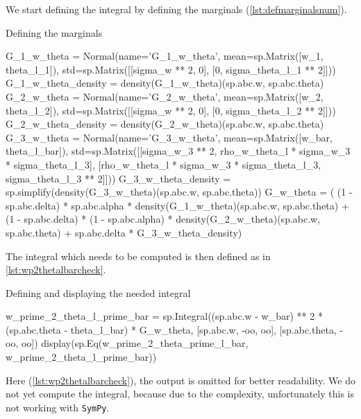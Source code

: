 We start defining the integral by defining the marginals (\cref{lst:defmarginalsnum}).
\begin{listing}[!ht]
    \caption{Defining the marginals}
    \label{lst:defmarginalsnum}
    \begin{pythoncode}
        G_1_w_theta = Normal(name='G_1_w_theta', mean=sp.Matrix([w_1, theta_l_1]),
            std=sp.Matrix([[sigma_w ** 2, 0], [0, sigma_theta_l_1 ** 2]]))
        G_1_w_theta_density = density(G_1_w_theta)(sp.abc.w, sp.abc.theta)
        G_2_w_theta = Normal(name='G_2_w_theta', mean=sp.Matrix([w_2, theta_l_2]),
            std=sp.Matrix([[sigma_w ** 2, 0], [0, sigma_theta_l_2 ** 2]]))
        G_2_w_theta_density = density(G_2_w_theta)(sp.abc.w, sp.abc.theta)
        G_3_w_theta = Normal(name='G_3_w_theta', mean=sp.Matrix([w_bar, theta_l_bar]),
            std=sp.Matrix([[sigma_w_3 ** 2,
                rho_w_theta_l * sigma_w_3 * sigma_theta_l_3],
                [rho_w_theta_l * sigma_w_3 * sigma_theta_l_3,
                sigma_theta_l_3 ** 2]]))
        G_3_w_theta_density = sp.simplify(density(G_3_w_theta)(sp.abc.w, sp.abc.theta))
        G_w_theta = (
        (1 - sp.abc.delta) * sp.abc.alpha * density(G_1_w_theta)(sp.abc.w, sp.abc.theta) 
        + (1 - sp.abc.delta) * (1 - sp.abc.alpha) * density(G_2_w_theta)(sp.abc.w, sp.abc.theta) 
        + sp.abc.delta * G_3_w_theta_density)
    \end{pythoncode}
\end{listing}

The integral which needs to be computed is then defined as in \cref{lst:wp2thetalbarcheck}.
\begin{listing}[!ht]
    \caption{Defining and displaying the needed integral}
    \label{lst:wp2thetalbarcheck}
    \begin{pythoncode}
        w_prime_2_theta_l_prime_bar = sp.Integral((sp.abc.w - w_bar) ** 2 * 
            (sp.abc.theta - theta_l_bar) * G_w_theta, 
            [sp.abc.w, -oo, oo], [sp.abc.theta, -oo, oo])
        display(sp.Eq(w_prime_2_theta_prime_l_bar, w_prime_2_theta_l_prime_bar))
    \end{pythoncode}
\end{listing}

Here (\cref{lst:wp2thetalbarcheck}), the output is omitted for better readability.
We do not yet compute the integral,
because due to the complexity,
unfortunately this is not working with \texttt{SymPy}.

